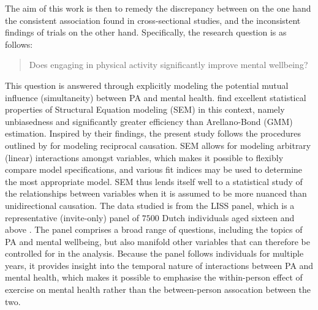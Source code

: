 The aim of this work is then to remedy the discrepancy between on the one hand the consistent association found in
cross-sectional studies, and the inconsistent findings of trials on the other hand. Specifically, the research question is as follows:
\begin{quote}
    Does engaging in physical activity significantly improve mental wellbeing?
\end{quote}
This question is answered through explicitly modeling the potential mutual influence (simultaneity) between PA and mental health.
 find excellent statistical properties of Structural Equation modeling (SEM)
in this context, namely unbiasedness and significantly greater efficiency than Arellano-Bond (GMM) estimation.
Inspired by their findings, the present study follows the procedures outlined by 
for modeling reciprocal causation.
SEM allows for modeling arbitrary (linear) interactions amongst variables,
which makes it possible to flexibly compare model specifications, and various fit indices may be used to determine
the most appropriate model.
SEM thus lends itself well to a statistical study of the relationships between variables when it is assumed to be
more nuanced than unidirectional causation.
The data studied is from the LISS panel, which is a representative (invite-only) panel of $7500$ Dutch individuals aged
sixteen and above \cite{scherpenzeel2010liss}. The panel comprises a broad range of questions, including the topics of PA
and mental wellbeing, but also manifold other variables that can therefore be controlled for in the analysis.
Because the panel follows individuals for multiple years, it provides insight into the temporal nature of interactions
between PA and mental health, which makes it possible to emphasise the within-person effect of exercise on mental health
rather than the between-person assocation between the two.


